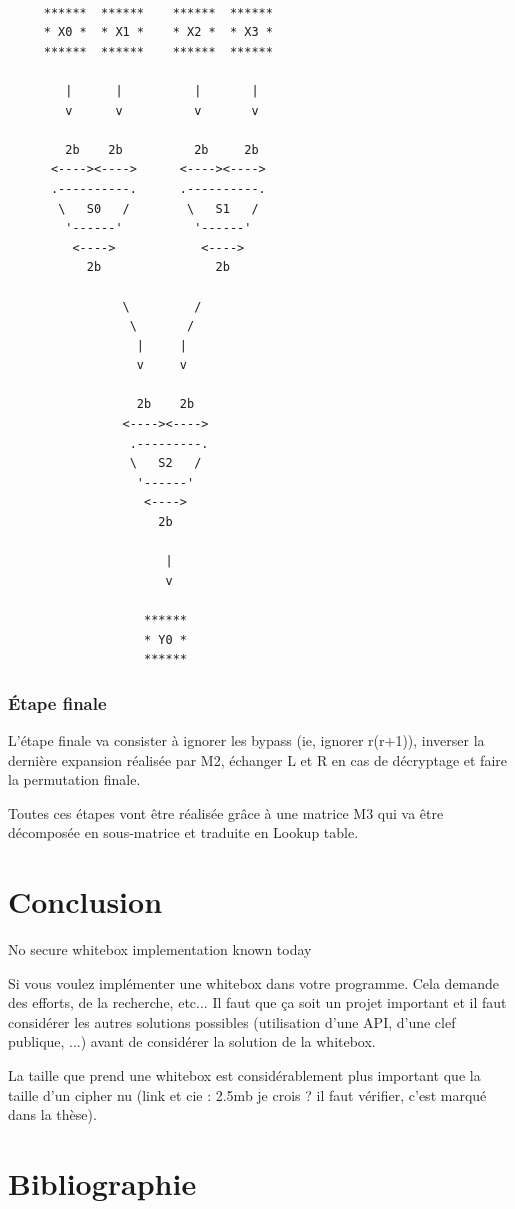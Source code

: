 \documentclass[a4paper,12pt]{article}
\begin{document}
\begin{Verbatim}[samepage=true]

     ******  ******    ******  ******
     * X0 *  * X1 *    * X2 *  * X3 *
     ******  ******    ******  ******

        |      |          |       |
        v      v          v       v

        2b    2b          2b     2b
      <----><---->      <----><---->
      .----------.      .----------.
       \   S0   /        \   S1   /
        '------'          '------'
         <---->            <---->
           2b                2b

                \         /
                 \       /
                  |     |
                  v     v

                  2b    2b
                <----><---->
                 .---------.
                 \   S2   /
                  '------'
                   <---->
                     2b

                      |
                      v

                   ******
                   * Y0 *
                   ******

\end{Verbatim}

\subsubsection{Étape finale}

L'étape finale va consister à ignorer les bypass (ie, ignorer r(r+1)), inverser la dernière expansion réalisée par M2, échanger L et R en cas de décryptage et faire la permutation finale.

Toutes ces étapes vont être réalisée grâce à une matrice M3 qui va être décomposée en sous-matrice et traduite en Lookup table.

\newpage

\section{Conclusion}

No secure whitebox implementation known today

Si vous voulez implémenter une whitebox dans votre programme. Cela demande des efforts, de la recherche, etc... Il faut que ça soit un projet important et il faut considérer les autres solutions possibles (utilisation d'une API, d'une clef publique, ...) avant de considérer la solution de la whitebox.

La taille que prend une whitebox est considérablement plus important que la taille d'un cipher nu (link et cie : 2.5mb je crois ? il faut vérifier, c'est marqué dans la thèse).

\newpage

\section{Bibliographie}
\end{document}
